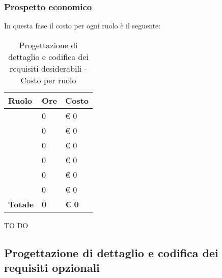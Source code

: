 		\subsubsection{Prospetto economico} %
		\label{ssub:prospetto_economico}
		In questa fase il costo per ogni ruolo è il seguente: \\
				\begin{table}[!h]
					\begin{center}
						\begin{tabularx}{0.6\textwidth}{|l|l|X|}
							\hline
							\textbf{Ruolo} & \textbf{Ore} & \textbf{Costo} \\
							\hline
							\roleProjectManager & 0 & \euro{} 0 \\
							\hline
							\roleAnalyst & 0 & \euro{} 0 \\
							\hline
							\roleDesigner & 0 & \euro{} 0 \\
							\hline
							\roleAdministrator & 0 & \euro{} 0 \\
							\hline
							\roleProgrammer & 0 & \euro{} 0 \\
							\hline
							\roleVerifier & 0 & \euro{} 0 \\
							\hline
							\textbf{Totale} & \textbf{0} & \textbf{\euro{} 0} \\
							\hline
						\end{tabularx}
					\end{center}
				\caption{Progettazione di dettaglio e codifica dei requisiti desiderabili - Costo per ruolo}
				\end{table}

			\noindent
			TO DO
		
	
	\subsection{Progettazione di dettaglio e codifica dei requisiti opzionali} %
	\label{sub:progettazione_di_dettaglio_e_codifica_dei_requisiti_opzionali}
